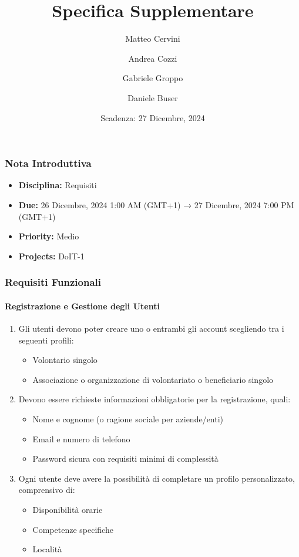 \title{Specifica Supplementare}
\author{Matteo Cervini \and Andrea Cozzi \and Gabriele Groppo \and Daniele Buser}
\date{Scadenza: 27 Dicembre, 2024}

\maketitle

\subsubsection{Nota Introduttiva}
\begin{itemize}
\item \textbf{Disciplina:} Requisiti
\item \textbf{Due:} 26 Dicembre, 2024 1:00 AM (GMT+1) → 27 Dicembre, 2024 7:00 PM (GMT+1)
\item \textbf{Priority:} Medio
\item \textbf{Projects:} DoIT-1
\end{itemize}

\subsubsection{Requisiti Funzionali}

\paragraph{Registrazione e Gestione degli Utenti}

\begin{enumerate}
    \item Gli utenti devono poter creare uno o entrambi gli account scegliendo tra i seguenti profili:
    \begin{itemize}
        \item Volontario singolo
        \item Associazione o organizzazione di volontariato o beneficiario singolo
    \end{itemize}
    
    \item Devono essere richieste informazioni obbligatorie per la registrazione, quali:
    \begin{itemize}
        \item Nome e cognome (o ragione sociale per aziende/enti)
        \item Email e numero di telefono
        \item Password sicura con requisiti minimi di complessità
    \end{itemize}
    
    \item Ogni utente deve avere la possibilità di completare un profilo personalizzato, comprensivo di:
    \begin{itemize}
        \item Disponibilità orarie
        \item Competenze specifiche
        \item Località
    \end{itemize}
\end{enumerate}

